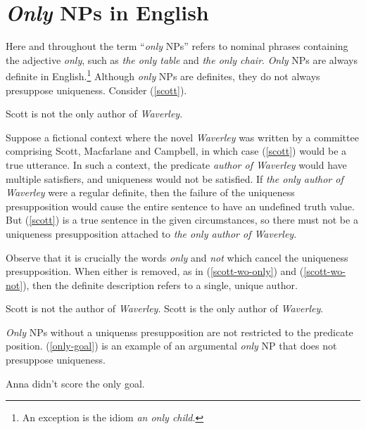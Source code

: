 \section{\textit{Only} NPs in English \label{sec:only-nps-english}}
Here and throughout the term ``\textit{only} NPs'' refers to nominal phrases containing the adjective \textit{only}, such as \textit{the only table} and \textit{the only chair}. \textit{Only} NPs are always definite in English.\footnote{An exception is the idiom \textit{an only child}.} Although \textit{only} NPs are definites, they do not always presuppose uniqueness. Consider (\ref{scott}).


\begin{exe}
	 Scott is not the only author of \textit{Waverley}.
\end{exe}

Suppose a fictional context where the novel \textit{Waverley} was written by a committee comprising Scott, Macfarlane and Campbell, in which case (\ref{scott}) would be a true utterance. In such a context, the predicate \textit{author of Waverley} would have multiple satisfiers, and uniqueness would not be satisfied. If \textit{the only author of Waverley} were a regular definite, then the failure of the uniqueness presupposition would cause the entire sentence to have an undefined truth value. But (\ref{scott}) is a true sentence in the given circumstances, so there must not be a uniqueness presupposition attached to \textit{the only author of Waverley}.

Observe that it is crucially the words \textit{only} and \textit{not} which cancel the uniqueness presupposition. When either is removed, as in (\ref{scott-wo-only}) and (\ref{scott-wo-not}), then the definite description refers to a single, unique author.

\begin{exe}
	\ex \label{scott-wo-only} Scott is not the author of \textit{Waverley}.
	\ex \label{scott-wo-not} Scott is the only author of \textit{Waverley}.
\end{exe}

\textit{Only} NPs without a uniquenss presupposition are not restricted to the predicate position. (\ref{only-goal}) is an example of an argumental \textit{only} NP that does not presuppose uniqueness.

\begin{exe}
	\ex \label{only-goal} Anna didn't score the only goal.
\end{exe}

